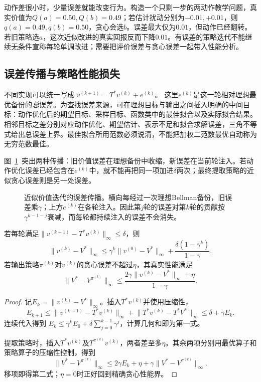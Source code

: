 动作差很小时，少量误差就能改变行为。构造一个只剩一步的两动作教学问题，真实价值为$Q(a)=0.50,Q(b)=0.49$；若估计扰动分别为$-0.01,+0.01$，则$q(a)=0.49,q(b)=0.50$，贪心会选$b$。误差最大仅为$0.01$，但动作已经翻转。若旧策略选$a$，这次近似改进的真实回报反而下降$0.01$。有误差的策略迭代不能继续无条件宣称每轮单调改进；需要把评价误差与贪心误差一起带入性能分析。

\subsection{误差传播与策略性能损失}
\label{sec:rl-planning-error-propagation}

不同实现可以统一写成
$v^{(k+1)}=T^*v^{(k)}+e^{(k)}$。
这里$e^{(k)}$是这一轮相对理想最优备份的\emph{总}误差。为查找误差来源，可在理想目标与输出之间插入明确的中间目标：动作优化后的期望目标、采样目标、函数类中的最佳拟合以及实际拟合结果。相邻目标之差分别对应动作优化、期望估计、表示不足和拟合求解误差，三角不等式给出总误差上界。最佳拟合所用范数必须说清，不能把加权二范数最优自动称为无穷范数最佳。

图~\ref{fig:rl-planning-error-flow}~突出两种传播：旧价值误差在理想备份中收缩，新误差在当前轮注入。若动作优化误差已经包含在$e^{(k)}$中，就不能再把同一项加进$\delta$两次；最终提取策略的近似贪心误差则是另一处误差。

\begin{figure}[htbp]
 \centering
 
 \caption{近似价值迭代的误差传播。横向每经过一次理想Bellman备份，旧误差乘$\gamma$；上方$e^{(k)}$在各轮注入。因此第$j$轮的误差对第$k$轮的贡献按$\gamma^{k-1-j}$衰减，而每轮都持续注入的误差不会消失。}
 \label{fig:rl-planning-error-flow}
\end{figure}

\begin{theorem}[近似价值迭代的统一误差界]
 \label{thm:rl-planning-avi-error}
 若每轮满足$\lVert v^{(k+1)}-T^*v^{(k)}\rVert_\infty\leq\delta$，则
 \begin{equation}
 \lVert v^{(k)}-V^*\rVert_\infty
 \leq\gamma^k\lVert v^{(0)}-V^*\rVert_\infty
       +\frac{\delta(1-\gamma^k)}{1-\gamma}.
 \label{eq:rl-planning-avi-error}
 \end{equation}
 若输出策略$\pi^{(k)}$对$v^{(k)}$的贪心误差不超过$\eta$，其真实性能满足
 \[
 \lVert V^*-V^{\pi^{(k)}}\rVert_\infty
 \leq\frac{2\gamma\lVert v^{(k)}-V^*\rVert_\infty+\eta}{1-\gamma}.
 \]
\end{theorem}
\begin{proof}
 记$E_k=\lVert v^{(k)}-V^*\rVert_\infty$。插入$T^*v^{(k)}$并使用压缩性，
 \[
 E_{k+1}\leq
 \lVert v^{(k+1)}-T^*v^{(k)}\rVert_\infty+
 \lVert T^*v^{(k)}-T^*V^*\rVert_\infty
 \leq\delta+\gamma E_k.
 \]
 连续代入得到
 $E_k\leq\gamma^kE_0+\delta\sum_{j=0}^{k-1}\gamma^j$，计算几何和即为第一式。

 提取策略时，插入$T^*v^{(k)}$及$T^{\pi^{(k)}}v^{(k)}$，两者差至多$\eta$。其余两项分别用最优算子和策略算子的压缩性控制，得到
 \[
 \lVert V^*-V^{\pi^{(k)}}\rVert_\infty
 \leq 2\gamma E_k+\eta+
       \gamma\lVert V^*-V^{\pi^{(k)}}\rVert_\infty.
 \]
 移项即得第二式；$\eta=0$时正好回到精确贪心性能界。
\end{proof}

